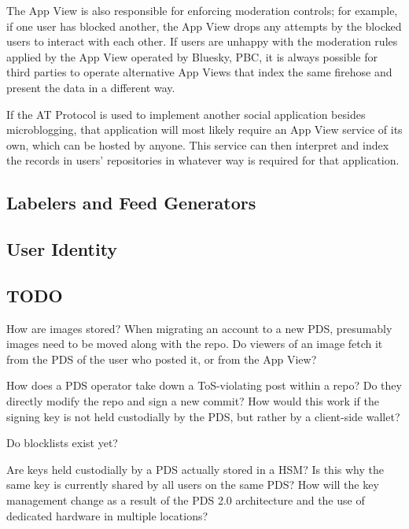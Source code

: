 \documentclass[sigconf,review]{acmart}
\begin{document}
The App View is also responsible for enforcing moderation controls; for example, if one user has blocked another, the App View drops any attempts by the blocked users to interact with each other.
If users are unhappy with the moderation rules applied by the App View operated by Bluesky, PBC, it is always possible for third parties to operate alternative App Views that index the same firehose and present the data in a different way.

If the AT Protocol is used to implement another social application besides microblogging, that application will most likely require an App View service of its own, which can be hosted by anyone.
This service can then interpret and index the records in users' repositories in whatever way is required for that application.

\subsection{Labelers and Feed Generators}\label{sec:labeling}

\subsection{User Identity}\label{sec:identity}



\subsection{TODO}

How are images stored? When migrating an account to a new PDS, presumably images need to be moved along with the repo. Do viewers of an image fetch it from the PDS of the user who posted it, or from the App View?

How does a PDS operator take down a ToS-violating post within a repo? Do they directly modify the repo and sign a new commit? How would this work if the signing key is not held custodially by the PDS, but rather by a client-side wallet?

Do blocklists exist yet?

Are keys held custodially by a PDS actually stored in a HSM? Is this why the same key is currently shared by all users on the same PDS? How will the key management change as a result of the PDS 2.0 architecture and the use of dedicated hardware in multiple locations?
\end{document}
